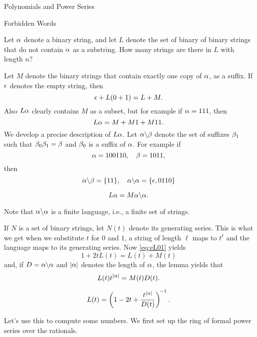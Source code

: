 \begin{chap}{Polynomials and Power Series}
%
\begin{sect}{Forbidden Words}
%
\begin{para}
Let $\alpha$ denote a binary string, and let $L$ denote
the set of binary of binary strings that do not contain $\alpha$ as a substring. 
How many strings are there in $L$ with length $n$?
\end{para}
%
\begin{para}
Let $M$ denote the binary
strings that contain exactly one copy of $\alpha$, as a suffix. 
If $\epsilon$ denotes the empty string, then
\begin{equation}
    \label{eq:eL01}
    \epsilon+L(0+1) = L+M.
\end{equation}
Also $L\alpha$ clearly contains $M$ as a subset, but for example if $\alpha=111$,
then
\[
    L\alpha =M+M1+M11.
\]
We develop a precise description of $L\alpha$. Let $\alpha\backslash\beta$ denote the 
set of suffixes $\beta_1$ such that
$\beta_0\beta_1=\beta$ and $\beta_0$ is a suffix of $\alpha$. For example if
\[
    \alpha =100110,\quad \beta=1011,
\]
then
\[
    \alpha\backslash\beta = \{11\},\quad \alpha\backslash\alpha = \{\epsilon,0110\}
\]
%
\begin{lemma}
    \[
        L\alpha = M\alpha\backslash\alpha.
    \]
\end{lemma}
\end{para}
%
\begin{para}
Note that $\alpha\backslash\alpha$ is a finite language, i.e., a finite set of strings.
\end{para}
%
\begin{para}
If $N$ is a set of binary strings, let $N(t)$ denote its generating series.
This is what we get when we substitute $t$ for $0$ and $1$, a string of length
$\ell$ maps to $t^\ell$ and the language maps to its generating series.
Now \eqref{eq:eL01} yields
\[
    1+2t L(t) = L(t)+M(t)
\]
and, if $D=\alpha\backslash\alpha$ and $|\alpha|$ denotes the length of $\alpha$, 
the lemma yields that
\[
    L(t)t^{|\alpha|} = M(t) D(t).
\]
%
\begin{lemma}
    \[
        L(t) =\left(1-2t+\frac{t^{|\alpha|}}{D(t)}\right)^{\!-1}.
    \]
\end{lemma}
\end{para}
%
\begin{para}
Let's use this to compute some numbers. We first set up the ring of formal
power series over the rationals.
\end{para}
%
\begin{sagecode}
\begin{sageinput}

\end{sageinput}
\end{sagecode}
\end{sect}
\end{chap}
